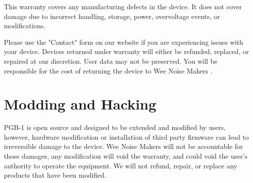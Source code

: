 \documentclass[8pt]{extarticle}
\def\device{PGB-1 }
\def\WNM{Wee Noise Makers }
\begin{document}
\begin{multicols*}{3}
This warranty covers any manufacturing defects in the device. It does not cover damage due to incorrect handling, storage, power, overvoltage events, or modifications.

Please use the "Contact" form on our website if you are experiencing issues with your device. Devices returned under warranty will either be refunded, replaced, or repaired at our discretion. User data may not be preserved. You will be responsible for the cost of returning the device to \WNM.

\section{Modding and Hacking}

\device is open source and designed to be extended and modified by users, however, hardware modification or installation of third party firmware can lead to irreversible damage to the device. \WNM will not be accountable for those damages, any modification will void the warranty, and could void the user’s authority to operate the equipment. We will not refund, repair, or replace any products that have been modified.

\end{multicols*}
\end{document}
